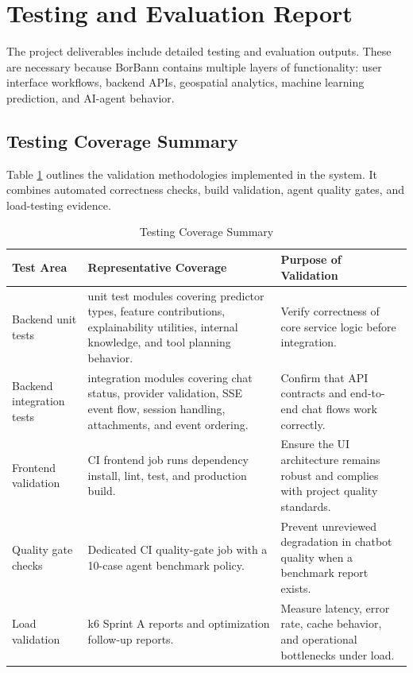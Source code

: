 \section{Testing and Evaluation Report}

The project deliverables include detailed testing and evaluation outputs. These are necessary because BorBann contains multiple layers of functionality: user interface workflows, backend APIs, geospatial analytics, machine learning prediction, and AI-agent behavior.

\subsection{Testing Coverage Summary}

Table \ref{tab:chapter7-testing-coverage} outlines the validation methodologies implemented in the system. It combines automated correctness checks, build validation, agent quality gates, and load-testing evidence.

\begin{table}[htbp]
    \centering
    \small
    \renewcommand{\arraystretch}{1.25}
    \begin{tabularx}{\textwidth}{>{\raggedright\arraybackslash}p{}>{\raggedright\arraybackslash}p{}>{\raggedright\arraybackslash}X}
        \toprule
        \rowcolor[gray]{0.9} \textbf{Test Area} & \textbf{Representative Coverage} & \textbf{Purpose of Validation} \\
        \midrule
        Backend unit tests & 13 unit test modules covering predictor types, feature contributions, explainability utilities, internal knowledge, and tool planning behavior. & Verify correctness of core service logic before integration. \\
        Backend integration tests & 2 integration modules covering chat status, provider validation, SSE event flow, session handling, attachments, and event ordering. & Confirm that API contracts and end-to-end chat flows work correctly. \\
        Frontend validation & CI frontend job runs dependency install, lint, test, and production build. & Ensure the UI architecture remains robust and complies with project quality standards. \\
        Quality gate checks & Dedicated CI quality-gate job with a 10-case agent benchmark policy. & Prevent unreviewed degradation in chatbot quality when a benchmark report exists. \\
        Load validation & k6 Sprint A reports and optimization follow-up reports. & Measure latency, error rate, cache behavior, and operational bottlenecks under load. \\
        \bottomrule
    \end{tabularx}
    \caption{Testing Coverage Summary}
    \label{tab:chapter7-testing-coverage}
\end{table}

